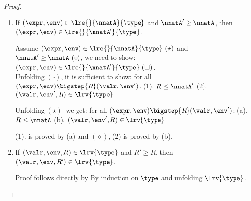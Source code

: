  \begin{proof}
\begin{enumerate} 
   \item If  
   $(\expr, \env) \in  \lre{}{\nnatA}{ \type} $ and $\nnatA' \geq \nnatA$,  then  
   $ (\expr, \env) \in  \lre{}{\nnatA'}{ \type} $.

     Assume $(\expr, \env) \in  \lre{}{\nnatA}{ \type}~(\star)$ and $\nnatA' \geq \nnatA~(\diamond)$, we need to show: $ (\expr, \env) \in  \lre{}{\nnatA'}{ \type}~(\square) $.\\
     Unfolding $(\square)$, it is sufficient to show: 
     for all $(\expr, \env) \bigstep{R} (\valr, \env')$:
     (1). $R \leq \nnatA'$
     (2). $(\valr, \env', R) \in \lrv{\type}$

     Unfolding $(\star)$, we get:
     for all $(\expr, \env) \bigstep{R} (\valr, \env')$:
     (a). $R \leq \nnatA$
     (b). $(\valr, \env', R) \in \lrv{\type}$
     
     (1). is proved by (a) and $(\diamond)$, (2) is proved by (b). 


   \item   If  $(
     \valr,\env,  R) \in  \lrv{\type} $ and $R' \geq R$,  then  $ (
     \valr,\env, R') \in  \lrv{\type} $.


     Proof follows directly by By induction on $\type$ and unfolding $\lrv{\type}$.\\




  \end{enumerate}
\end{proof}
